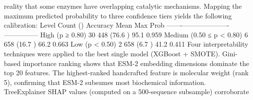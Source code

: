 {}reality that some enzymes have overlapping catalytic mechanisms.\markdownRendererInterblockSeparator
{}
\markdownRendererSectionEnd \markdownRendererSectionBegin
{}\markdownRendererInterblockSeparator
{}Mapping the maximum predicted probability to three confidence tiers yields the following\markdownRendererSoftLineBreak
{}calibration:\markdownRendererParagraphSeparator
{}\markdownRendererPipe{} Level \markdownRendererPipe{} Count (\markdownRendererPercentSign{}) \markdownRendererPipe{} Accuracy \markdownRendererPipe{} Mean Max Prob \markdownRendererPipe{}\markdownRendererSoftLineBreak
{}\markdownRendererPipe{}-------\markdownRendererPipe{}-----------\markdownRendererPipe{}----------\markdownRendererPipe{}---------------\markdownRendererPipe{}\markdownRendererSoftLineBreak
{}\markdownRendererPipe{} High (p ≥ 0.80) \markdownRendererPipe{} 30 448 (76.6 \markdownRendererPercentSign{}) \markdownRendererPipe{} 95.1 \markdownRendererPercentSign{} \markdownRendererPipe{} 0.959 \markdownRendererPipe{}\markdownRendererSoftLineBreak
{}\markdownRendererPipe{} Medium (0.50 ≤ p < 0.80) \markdownRendererPipe{} 6 658 (16.7 \markdownRendererPercentSign{}) \markdownRendererPipe{} 66.2 \markdownRendererPercentSign{} \markdownRendererPipe{} 0.663 \markdownRendererPipe{}\markdownRendererSoftLineBreak
{}\markdownRendererPipe{} Low (p < 0.50) \markdownRendererPipe{} 2 658 (6.7 \markdownRendererPercentSign{}) \markdownRendererPipe{} 41.2 \markdownRendererPercentSign{} \markdownRendererPipe{} 0.411 \markdownRendererPipe{}\markdownRendererParagraphSeparator
{}\markdownRendererInterblockSeparator
{}
\markdownRendererSectionEnd 
\markdownRendererSectionEnd \markdownRendererSectionBegin
{}\markdownRendererInterblockSeparator
{}Four interpretability techniques were applied to the best single model (XGBoost + SMOTE).\markdownRendererParagraphSeparator
{} Gini-based importance ranking shows that ESM-2 embedding dimensions\markdownRendererSoftLineBreak
{}dominate the top 20 features. The highest-ranked handcrafted feature is molecular weight\markdownRendererSoftLineBreak
{}(rank 5), confirming that ESM-2 subsumes most biochemical information.\markdownRendererParagraphSeparator
{} TreeExplainer SHAP values (computed on a 500-sequence subsample) corroborate\markdownRendererSoftLineBreak
